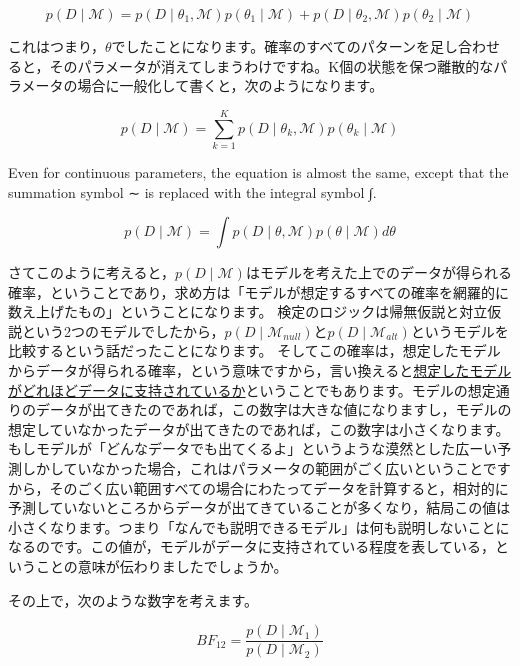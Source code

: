 \documentclass{ltjbook}
\begin{document}
\[ p(D\mid \mathcal{M}) = p(D\mid \theta_1,\mathcal{M})p(\theta_1\mid \mathcal{M}) + p(D\mid \theta_2,\mathcal{M})p(\theta_2\mid \mathcal{M}) \]

これはつまり，$\theta$でしたことになります。確率のすべてのパターンを足し合わせると，そのパラメータが消えてしまうわけですね。K個の状態を保つ離散的なパラメータの場合に一般化して書くと，次のようになります。

\[ p(D\mid \mathcal{M}) = \sum_{k=1}^K p(D\mid \theta_k,\mathcal{M})p(\theta_k\mid \mathcal{M}) \]

Even for continuous parameters, the equation is almost the same, except that the summation symbol ∼ is replaced with the integral symbol ∫.

\[ p(D \mid \mathcal{M}) = \int p(D\mid \theta,\mathcal{M})p(\theta\mid\mathcal{M}) d\theta \]

さてこのように考えると，$p(D \mid \mathcal{M})$はモデルを考えた上でのデータが得られる確率，ということであり，求め方は「モデルが想定するすべての確率を網羅的に数え上げたもの」ということになります。
検定のロジックは帰無仮説と対立仮説という2つのモデルでしたから，$p(D \mid \mathcal{M}_{null})$と$p(D \mid \mathcal{M}_{alt})$というモデルを比較するという話だったことになります。
そしてこの確率は，想定したモデルからデータが得られる確率，という意味ですから，言い換えると\underline{想定したモデルがどれほどデータに支持されているか}ということでもあります。モデルの想定通りのデータが出てきたのであれば，この数字は大きな値になりますし，モデルの想定していなかったデータが出てきたのであれば，この数字は小さくなります。もしモデルが「どんなデータでも出てくるよ」というような漠然とした広ーい予測しかしていなかった場合，これはパラメータの範囲がごく広いということですから，そのごく広い範囲すべての場合にわたってデータを計算すると，相対的に予測していないところからデータが出てきていることが多くなり，結局この値は小さくなります。つまり「なんでも説明できるモデル」は何も説明しないことになるのです。この値が，モデルがデータに支持されている程度を表している，ということの意味が伝わりましたでしょうか。

その上で，次のような数字を考えます。

\[ BF_{12} = \frac{p(D\mid \mathcal{M}_1)}{p(D\mid \mathcal{M}_2)} \]
\end{document}

